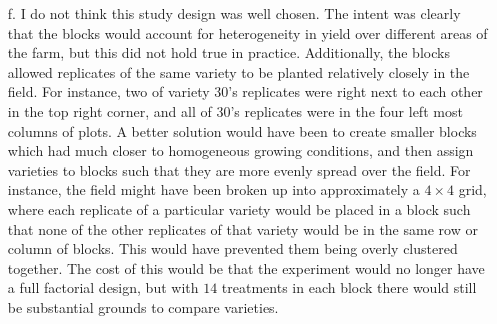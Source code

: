 \documentclass[11pt]{article}
\theoremstyle{definition}
\begin{document}
\begin{itemize}
    \item[f.]
        I do not think this study design was well chosen. The intent was clearly that the blocks would account for heterogeneity in yield over different areas of the farm, but this did not hold true in practice. Additionally, the blocks allowed replicates of the same variety to be planted relatively closely in the field. For instance, two of variety 30's replicates were right next to each other in the top right corner, and all of 30's replicates were in the four left most columns of plots. A better solution would have been to create smaller blocks which had much closer to homogeneous growing conditions, and then assign varieties to blocks such that they are more evenly spread over the field. For instance, the field might have been broken up into approximately a $4\times4$ grid, where each replicate of a particular variety would be placed in a block such that none of the other replicates of that variety would be in the same row or column of blocks. This would have prevented them being overly clustered together. The cost of this would be that the experiment would no longer have a full factorial design, but with $14$ treatments in each block there would still be substantial grounds to compare varieties.
        


\end{itemize}
\end{document}
